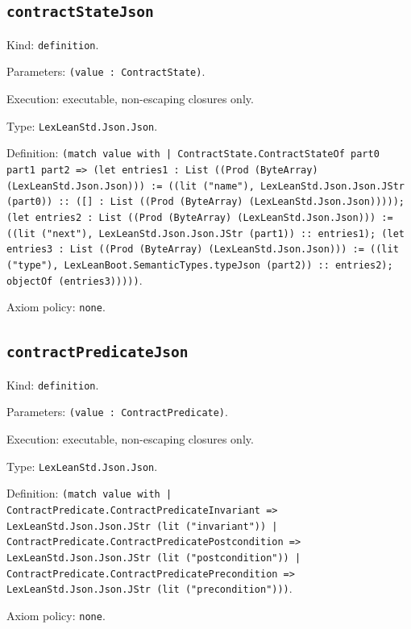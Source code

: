 \documentclass[11pt]{article}
\begin{document}
\subsection*{\texttt{contractStateJson}}
\noindent Kind: \texttt{definition}.\par
\noindent Parameters: \texttt{(value : ContractState)}.\par
\noindent Execution: executable, non-escaping closures only.\par
\noindent Type: \texttt{LexLeanStd.Json.Json}.\par
\noindent Definition: \texttt{(match value with | ContractState.ContractStateOf part0 part1 part2 => (let entries1 : List ((Prod (ByteArray) (LexLeanStd.Json.Json))) := ((lit ("name"), LexLeanStd.Json.Json.JStr (part0)) :: ([] : List ((Prod (ByteArray) (LexLeanStd.Json.Json))))); (let entries2 : List ((Prod (ByteArray) (LexLeanStd.Json.Json))) := ((lit ("next"), LexLeanStd.Json.Json.JStr (part1)) :: entries1); (let entries3 : List ((Prod (ByteArray) (LexLeanStd.Json.Json))) := ((lit ("type"), LexLeanBoot.SemanticTypes.typeJson (part2)) :: entries2); objectOf (entries3)))))}.\par
\noindent Axiom policy: \texttt{none}.\par
\subsection*{\texttt{contractPredicateJson}}
\noindent Kind: \texttt{definition}.\par
\noindent Parameters: \texttt{(value : ContractPredicate)}.\par
\noindent Execution: executable, non-escaping closures only.\par
\noindent Type: \texttt{LexLeanStd.Json.Json}.\par
\noindent Definition: \texttt{(match value with | ContractPredicate.ContractPredicateInvariant => LexLeanStd.Json.Json.JStr (lit ("invariant")) | ContractPredicate.ContractPredicatePostcondition => LexLeanStd.Json.Json.JStr (lit ("postcondition")) | ContractPredicate.ContractPredicatePrecondition => LexLeanStd.Json.Json.JStr (lit ("precondition")))}.\par
\noindent Axiom policy: \texttt{none}.\par
\end{document}
